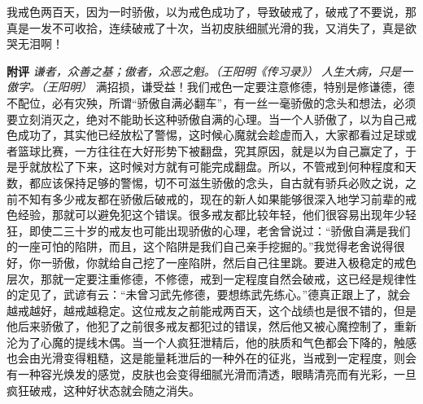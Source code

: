 \begin{case}
    我戒色两百天，因为一时骄傲，以为戒色成功了，导致破戒了，破戒了不要说，那真是一发不可收拾，连续破戒了十次，当初皮肤细腻光滑的我，又消失了，真是欲哭无泪啊！

    \textbf{附评} \textit{谦者，众善之基；傲者，众恶之魁。（王阳明《传习录》）} \textit{人生大病，只是一傲字。（王阳明）} 满招损，谦受益！我们戒色一定要注意修德，特别是修谦德，德不配位，必有灾殃，所谓“骄傲自满必翻车”，有一丝一毫骄傲的念头和想法，必须要立刻消灭之，绝对不能助长这种骄傲自满的心理。当一个人骄傲了，以为自己戒色成功了，其实他已经放松了警惕，这时候心魔就会趁虚而入，大家都看过足球或者篮球比赛，一方往往在大好形势下被翻盘，究其原因，就是以为自己赢定了，于是乎就放松了下来，这时候对方就有可能完成翻盘。所以，不管戒到何种程度和天数，都应该保持足够的警惕，切不可滋生骄傲的念头，自古就有骄兵必败之说，之前不知有多少戒友都在骄傲后破戒的，现在的新人如果能够很深入地学习前辈的戒色经验，那就可以避免犯这个错误。很多戒友都比较年轻，他们很容易出现年少轻狂，即使二三十岁的戒友也可能出现骄傲的心理，老舍曾说过：“骄傲自满是我们的一座可怕的陷阱，而且，这个陷阱是我们自己亲手挖掘的。”我觉得老舍说得很好，你一骄傲，你就给自己挖了一座陷阱，然后自己往里跳。要进入极稳定的戒色层次，那就一定要注重修德，不修德，戒到一定程度自然会破戒，这已经是规律性的定见了，武谚有云：“未曾习武先修德，要想练武先练心。”德真正跟上了，就会越戒越好，越戒越稳定。这位戒友之前能戒两百天，这个战绩也是很不错的，但是他后来骄傲了，他犯了之前很多戒友都犯过的错误，然后他又被心魔控制了，重新沦为了心魔的提线木偶。当一个人疯狂泄精后，他的肤质和气色都会下降的，触感也会由光滑变得粗糙，这是能量耗泄后的一种外在的征兆，当戒到一定程度，则会有一种容光焕发的感觉，皮肤也会变得细腻光滑而清透，眼睛清亮而有光彩，一旦疯狂破戒，这种好状态就会随之消失。
\end{case}

